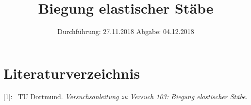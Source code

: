 

\subject{Nr. 103}
\title{Biegung elastischer Stäbe}
\date{%
  Durchführung: 27.11.2018
  \hspace{3em}
  Abgabe: 04.12.2018
}



\maketitle
\thispagestyle{empty}
\tableofcontents
\newpage






\printbibliography{}

\section{Literaturverzeichnis}

[1]: \ TU Dortmund. \textit{Versuchsanleitung zu Versuch 103: Biegung elastischer Stäbe.}\newline


